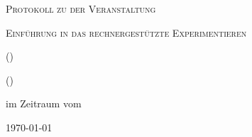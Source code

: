 
\makeatletter
\newcommand*{\protokollemailparse}[1]{%
	\@for\@tempa:=#1\do{%
		\normalsize\email{\@tempa}\\
	}%
}
\makeatother

\begin{titlepage}
	\centering
	{\scshape\LARGE Protokoll zu der Veranstaltung \par}
	\vspace{1cm}
	{\scshape\huge Einführung in das rechnergestützte Experimentieren\par}
	\vspace{2.5cm}
	{\large \varNameA (\varEmailA) \par}
	{\large \varNameB (\varEmailB) \par}
	\vfill
	im Zeitraum vom \varDatum\par
	{\large \varBetreuer} 
	\vfill	
	{\large \today\par}
\end{titlepage}


\maketitle
